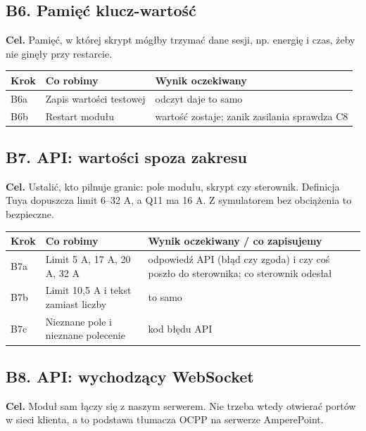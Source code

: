\documentclass[11pt,a4paper]{article}
\begin{document}
\subsection{B6. Pamięć klucz-wartość}

\textbf{Cel.} Pamięć, w której skrypt mógłby trzymać dane sesji, np. energię i czas, żeby nie ginęły przy restarcie.


\begin{longtable}{>{\raggedright\arraybackslash}p{3.00cm}>{\raggedright\arraybackslash}p{4.52cm}>{\raggedright\arraybackslash}p{7.76cm}}
\toprule
\rowcolor{apteallight}\textbf{Krok} & \textbf{Co robimy} & \textbf{Wynik oczekiwany} \\
\midrule\endhead
\bottomrule\endfoot
B6a & Zapis wartości testowej & odczyt daje to samo \\
B6b & Restart modułu & wartość zostaje; zanik zasilania sprawdza C8 \\
\end{longtable}

\subsection{B7. API: wartości spoza zakresu}

\textbf{Cel.} Ustalić, kto pilnuje granic: pole modułu, skrypt czy sterownik. Definicja Tuya dopuszcza limit 6–32 A, a Q11 ma 16 A. Z symulatorem bez obciążenia to bezpieczne.


\begin{longtable}{>{\raggedright\arraybackslash}p{3.00cm}>{\raggedright\arraybackslash}p{5.37cm}>{\raggedright\arraybackslash}p{6.91cm}}
\toprule
\rowcolor{apteallight}\textbf{Krok} & \textbf{Co robimy} & \textbf{Wynik oczekiwany / co zapisujemy} \\
\midrule\endhead
\bottomrule\endfoot
B7a & Limit 5 A, 17 A, 20 A, 32 A & odpowiedź API (błąd czy zgoda) i czy coś poszło do sterownika; co sterownik odesłał \\
B7b & Limit 10,5 A i tekst zamiast liczby & to samo \\
B7c & Nieznane pole i nieznane polecenie & kod błędu API \\
\end{longtable}

\subsection{B8. API: wychodzący WebSocket}

\textbf{Cel.} Moduł sam łączy się z naszym serwerem. Nie trzeba wtedy otwierać portów w sieci klienta, a to podstawa tłumacza OCPP na serwerze AmperePoint.
\end{document}
